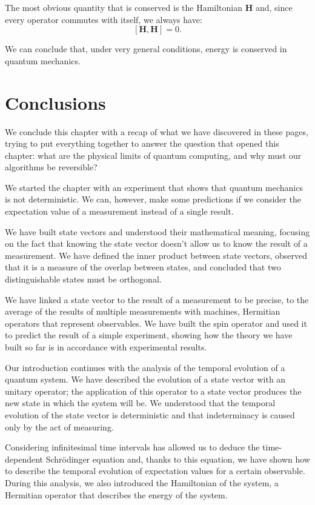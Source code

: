 The most obvious quantity that is conserved is the Hamiltonian $\mathbf{H}$ and, since every operator commutes with itself, we always have:
\[
[\mathbf{H},\mathbf{H}] = 0.
\]

We can conclude that, under very general conditions, energy is conserved in quantum mechanics.

\section{Conclusions}
We conclude this chapter with a recap of what we have discovered in these pages, trying to put everything together to answer the question that opened this chapter: what are the physical limits of quantum computing, and why must our algorithms be reversible?

We started the chapter with an experiment that shows that quantum mechanics is not deterministic. We can, however, make some predictions if we consider the expectation value of a measurement instead of a single result.

We have built state vectors and understood their mathematical meaning, focusing on the fact that knowing the state vector doesn't allow us to know the result of a measurement. We have defined the inner product between state vectors, observed that it is a measure of the overlap between states, and concluded that two distinguishable states must be orthogonal.

We have linked a state vector to the result of a measurement \textendash{}to be precise, to the average of the results of multiple measurements\textendash{} with machines, Hermitian operators that represent observables. We have built the spin operator and used it to predict the result of a simple experiment, showing how the theory we have built so far is in accordance with experimental results.

Our introduction continues with the analysis of the temporal evolution of a quantum system. We have described the evolution of a state vector with an unitary operator; the application of this operator to a state vector produces the new state in which the system will be. We understood that the temporal evolution of the state vector is deterministic and that indeterminacy is caused only by the act of measuring.

Considering infinitesimal time intervals has allowed us to deduce the time-dependent Schrödinger equation and, thanks to this equation, we have shown how to describe the temporal evolution of expectation values for a certain observable. During this analysis, we also introduced the Hamiltonian of the system, a Hermitian operator that describes the energy of the system. 

